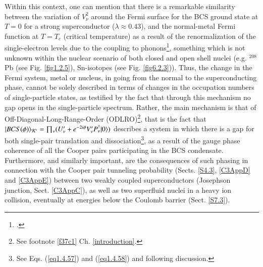Within this context, one can mention that there is a remarkable similarity between the variation of $V^2_\nu$ around the Fermi surface for the BCS ground state at $T=0$ for a strong superconductor ($\lambda\approx0.43$), and the normal-metal Fermi function at $T=T_c$ (critical temperature) as a result of the renormalization of the single-electron levels due to the coupling to phonons\footnote{\cite{Tinkham:96}.}, something which is not unknown within the nuclear scenario of both closed and  open shell nuclei (e.g. $^{208}$Pb (see Fig. \ref{fig1.2.5}), Sn-isotopes (see Fig. \ref{fig6.2.3})). Thus, the change in the Fermi system, metal or nucleus, in going from the normal to the superconducting phase, cannot be solely described in terms of changes in the occupation numbers of single-particle states, as testified by the fact that through this mechanism no gap opens in the single-particle spectrum. Rather, the main mechanism is that of Off-Diagonal-Long-Range-Order (ODLRO)\footnote{See footnote \ref{f37c1} Ch. \ref{introduction}.}, that is the fact that $|{BCS(\phi)} \rangle_{\mathcal K'}=\prod_\nu(U'_\nu+e^{-2i\phi}V'_\nu P^\dagger_\nu|{0} \rangle)$ describes a system in which there is a gap for both single-pair translation and dissociation\footnote{See Eqs. (\ref{eq1.4.57}) and (\ref{eq1.4.58}) and following discussion.}, as a result of the gauge phase coherence of all the Cooper pairs participating in the BCS condensate. Furthermore, and similarly important, are the consequences of such phasing in connection with the Cooper pair tunneling probability (Sects. \ref{S4.3}, \ref{C3AppD} and \ref{C3AppE}) between two weakly coupled superconductors (Josephson junction, Sect. \ref{C3AppC}), as well as two superfluid nuclei in a heavy ion collision, eventually at energies below the Coulomb barrier (Sect. \ref{S7.3}).



